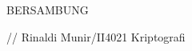 \documentclass{article}
\begin{document}

BERSAMBUNG

\vspace{50mm}

\begin{center}
// Rinaldi Munir/II4021 Kriptografi
\end{center}
\end{document}
